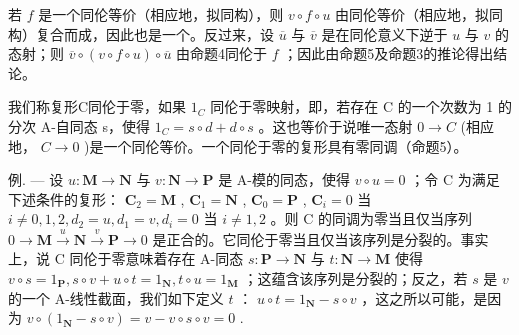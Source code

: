 若 \(f\) 是一个同伦等价（相应地，拟同构），则 \(v \circ f \circ u\) 由同伦等价（相应地，拟同构）复合而成，因此也是一个。反过来，设 \(\overline{u}\) 与 \(\overline{v}\) 是在同伦意义下逆于 \(u\) 与 \(v\) 的态射；则 \(\overline{v} \circ (v \circ f \circ u) \circ \overline{u}\) 由命题4同伦于 \(f\) ；因此由命题5及命题3的推论得出结论。

我们称复形C同伦于零，如果 \(1_{C}\) 同伦于零映射，即，若存在 C 的一个次数为 1 的分次 A-自同态 s，使得 \(1_{C} = s \circ d + d \circ s\) 。这也等价于说唯一态射 \(0 \to C\) (相应地， \(C \to 0\) )是一个同伦等价。一个同伦于零的复形具有零同调（命题5）。

例. --- 设 \(u: \mathbf{M} \to \mathbf{N}\) 与 \(v: \mathbf{N} \to \mathbf{P}\) 是 A-模的同态，使得 \(v \circ u = 0\) ；令 C 为满足下述条件的复形： \(\mathbf{C}_2 = \mathbf{M}\) , \(\mathbf{C}_1 = \mathbf{N}\) , \(\mathbf{C}_0 = \mathbf{P}\) , \(\mathbf{C}_i = 0\) 当 \(i \neq 0, 1, 2, d_2 = u, d_1 = v, d_i = 0\) 当 \(i \neq 1, 2\) 。则 C 的同调为零当且仅当序列 \(0 \to \mathbf{M} \xrightarrow{u} \mathbf{N} \xrightarrow{v} \mathbf{P} \to 0\) 是正合的。它同伦于零当且仅当该序列是分裂的。事实上，说 C 同伦于零意味着存在 A-同态 \(s: \mathbf{P} \to \mathbf{N}\) 与 \(t: \mathbf{N} \to \mathbf{M}\) 使得 \(v \circ s = 1_{\mathbf{P}}, s \circ v + u \circ t = 1_{\mathbf{N}}, t \circ u = 1_{\mathbf{M}}\) ；这蕴含该序列是分裂的；反之，若 \(s\) 是 \(v\) 的一个 A-线性截面，我们如下定义 \(t\) ： \(u \circ t = 1_{\mathbf{N}} - s \circ v\) ，这之所以可能，是因为 \(v \circ (1_{\mathbf{N}} - s \circ v) = v - v \circ s \circ v = 0\) .

